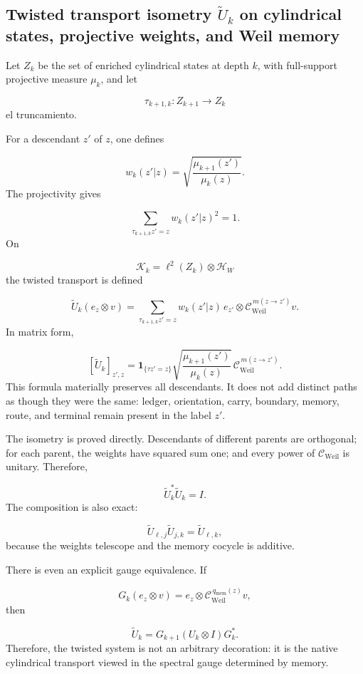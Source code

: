 \subsection{Twisted transport isometry \(\widetilde U_k\) on cylindrical states, projective weights, and Weil memory}
Let \(Z_k\) be the set of enriched cylindrical states at depth \(k\), with full-support projective measure \(\mu_k\), and let\par
\[
\tau_{k+1,k}:Z_{k+1}\longrightarrow Z_k
\]
el truncamiento.\par
For a descendant \(z'\) of \(z\), one defines\par
\[
w_k(z'|z)
=
\sqrt{\frac{\mu_{k+1}(z')}{\mu_k(z)}}.
\]
The projectivity gives\par
\[
\sum_{\tau_{k+1,k}z'=z}w_k(z'|z)^2=1.
\]
On\par
\[
\mathscr K_k
=
\ell^2(Z_k)\otimes\mathcal H_W
\]
the twisted transport is defined\par
\[
\widetilde U_k(e_z\otimes v)
=
\sum_{\tau_{k+1,k}z'=z}
w_k(z'|z)\,
e_{z'}\otimes
\mathcal C_{\mathrm{Weil}}^{\,m(z\to z')}v.
\]
In matrix form,\par
\[
[\widetilde U_k]_{z',z}
=
\mathbf 1_{\{\tau z'=z\}}
\sqrt{\frac{\mu_{k+1}(z')}{\mu_k(z)}}
\,
\mathcal C_{\mathrm{Weil}}^{\,m(z\to z')}.
\]
This formula materially preserves all descendants. It does not add distinct paths as though they were the same: ledger, orientation, carry, boundary, memory, route, and terminal remain present in the label \(z'\).\par
The isometry is proved directly. Descendants of different parents are orthogonal; for each parent, the weights have squared sum one; and every power of \(\mathcal C_{\mathrm{Weil}}\) is unitary. Therefore,\par
\[
\widetilde U_k^*\widetilde U_k=I.
\]
The composition is also exact:\par
\[
\widetilde U_{\ell,j}\widetilde U_{j,k}
=
\widetilde U_{\ell,k},
\]
because the weights telescope and the memory cocycle is additive.\par
There is even an explicit gauge equivalence. If\par
\[
G_k(e_z\otimes v)
=
e_z\otimes
\mathcal C_{\mathrm{Weil}}^{\,q_{\mathrm{mem}}(z)}v,
\]
then\par
\[
\widetilde U_k
=
G_{k+1}(U_k\otimes I)G_k^*.
\]
Therefore, the twisted system is not an arbitrary decoration: it is the native cylindrical transport viewed in the spectral gauge determined by memory.\par
